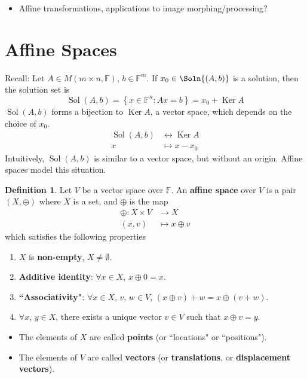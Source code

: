 \documentclass[letterpaper,12pt]{article}
\theoremstyle{definition}
\newtheorem*{definition}{Definition}
\newcommand{\set}[1]{\left\{ #1 \right\}}
\DeclareMathOperator{\ker}{Ker}
\DeclareMathOperator{\Sol}{Sol}
\begin{document}
\begin{itemize}
    \item Affine transformations, applications to image morphing/processing?
\end{itemize}

\section*{Affine Spaces}
Recall: Let $A \in M(m \times n, \mathbb{F})$, $b \in \mathbb{F}^m$. If $x_0 \in \Soln{(A,b)}$ is a solution, then the solution set is
\begin{equation*}
    \Sol{(A,b)} = \set{x \in \mathbb{F}^n: Ax = b} = x_0 + \ker{A}
\end{equation*}
$\Sol{(A,b)}$ forms a bijection to $\ker{A}$, a vector space, which depends on the choice of $x_0$.
\begin{align*}
    \Sol{(A,b)} & \longleftrightarrow \ker{A} \\
    x & \longmapsto x - x_0
\end{align*}
Intuitively, $\Sol{(A,b)}$ is similar to a vector space, but without an origin. Affine spaces model this situation.

\begin{definition}
Let $V$ be a vector space over $\mathbb{F}$. An \textbf{affine space} over $V$ is a pair $(X, \oplus)$ where $X$ is a set, and $\oplus$ is the map
\begin{align*}
    \oplus : X \times V & \longrightarrow X \\
    (x,v) & \longmapsto x \oplus v
\end{align*}
which satisfies the following properties
\begin{enumerate}
    \item $X$ is \textbf{non-empty}, $X \neq \emptyset$.
    \item \textbf{Additive identity}: $\forall x \in X$, $x \oplus 0 = x$.
    \item \textbf{``Associativity"}: $\forall x \in X$, $v$, $w \in V$, $(x \oplus v) + w = x \oplus (v + w)$.
    \item $\forall x$, $y \in X$, there exists a unique vector $v \in V$ such that $x \oplus v = y$.
\end{enumerate}
\end{definition}
\begin{itemize}
    \item The elements of $X$ are called \textbf{points} (or ``locations" or ``positions").
    \item The elements of $V$ are called \textbf{vectors} (or \textbf{translations}, or \textbf{displacement vectors}).
\end{itemize}
\end{document}
